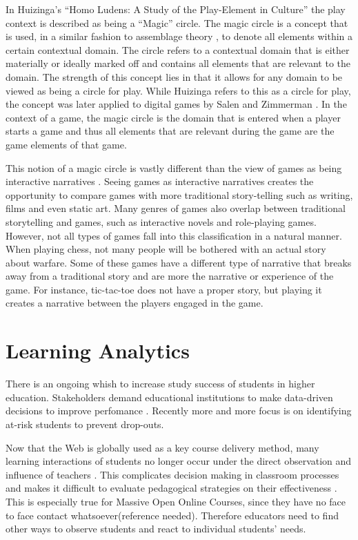 \documentclass[11pt]{article}
\begin{document}
In Huizinga's ``Homo Ludens: A Study of the Play-Element in Culture'' \cite{Huizinga} the play context is described as being a ``Magic'' circle. The magic circle is a concept that is used, in a similar fashion to assemblage theory \cite{Taylor2009}, to denote all elements within a certain contextual domain. The circle refers to a contextual domain that is either materially or ideally marked off and contains all elements that are relevant to the domain. The strength of this concept lies in that it allows for any domain to be viewed as being a circle for play. While Huizinga refers to this as a circle for play, the concept was later applied to digital games by Salen and Zimmerman \cite{Zimmerman2004}. In the context of a game, the magic circle is the domain that is entered when a player starts a game and thus all elements that are relevant during the game are the game elements of that game.

This notion of a magic circle is vastly different than the view of games as being interactive narratives \cite{Hartsook2011,Marchiori2011,Li2012,Jenkins2004}. Seeing games as interactive narratives creates the opportunity to compare games with more traditional story-telling such as writing, films and even static art. Many genres of games also overlap between traditional storytelling and games, such as interactive novels and role-playing games. However, not all types of games fall into this classification in a natural manner. When playing chess, not many people will be bothered with an actual story about warfare. Some of these games have a different type of narrative that breaks away from a traditional story and are more the narrative or experience of the game. For instance, tic-tac-toe does not have a proper story, but playing it creates a narrative between the players engaged in the game.



\section{Learning Analytics}

There is an ongoing whish to increase study success of students in higher education. Stakeholders demand educational institutions to make data-driven decisions to improve perfomance \cite{Ferguson2012a}. Recently more and more focus is on identifying at-risk students to prevent drop-outs.

Now that the Web is globally used as a key course delivery method, many learning interactions of students no longer occur under the direct observation and influence of teachers \cite{Sheard2003}. This complicates decision making in classroom processes and makes it difficult to evaluate pedagogical strategies on their effectiveness \cite{Romero2007}. This is especially true for Massive Open Online Courses, since they have no face to face contact whatsoever(reference needed). Therefore educators need to find other ways to observe students and react to individual students' needs.
\end{document}
